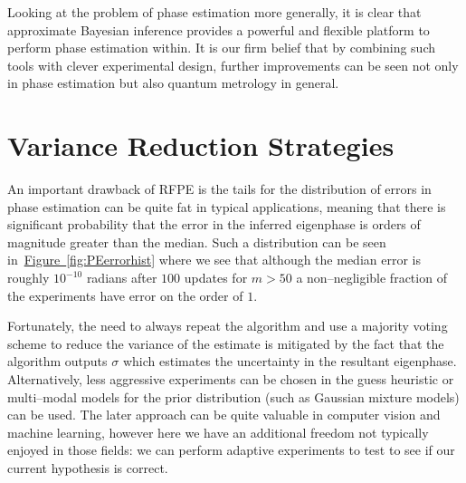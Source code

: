 \documentclass[aps,pra,amsmath,twocolumn,amssymb,superscriptaddress]{revtex4-1}
\newcommand{\fig}[1]{\hyperref[fig:#1]{Figure~\ref*{fig:#1}}}
\begin{document}
{Looking at the problem of phase estimation more generally, it is clear that approximate Bayesian inference
provides a powerful and flexible platform to perform phase estimation within.
It is our firm belief that by combining such tools with clever experimental design,
further improvements can be seen not only in phase estimation but also quantum metrology in general.





\pagebreak
\appendix


\onecolumngrid

\section{Variance Reduction Strategies}
\label{app:var-reduction}

An important drawback of RFPE is  the tails for the distribution of errors in phase estimation can be quite fat in typical applications, meaning that there is significant probability that the error in the inferred eigenphase is orders of magnitude greater than the median.  Such a distribution can be seen in~\fig{PEerrorhist} where we see that although the median error is roughly $10^{-10}$ radians after $100$ updates for $m>50$  a non--negligible fraction of the experiments have error on the order of $1$.    

Fortunately, the need to always repeat the algorithm and use a majority voting scheme to reduce the variance of the estimate is mitigated by the fact that the algorithm outputs $\sigma$ which estimates the uncertainty in the resultant eigenphase. 
Alternatively, less aggressive experiments can be chosen in the guess heuristic or multi--modal models for the prior distribution (such as Gaussian mixture models) can be used.  The later approach can be quite valuable in computer vision and machine learning, however here we have an additional freedom not typically enjoyed in those fields: we can perform adaptive experiments to test to see if our current hypothesis is correct.

}
\end{document}
